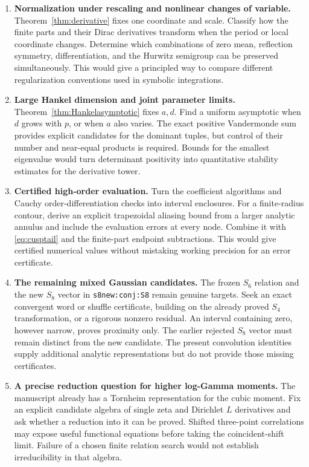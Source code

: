 \documentclass[11pt]{article}
\numberwithin{equation}{section}
\theoremstyle{definition}\newtheorem{definition}[theorem]{Definition}
\theoremstyle{remark}\newtheorem{remark}[theorem]{Remark}
\begin{document}
\begin{enumerate}[leftmargin=*,label=\textbf{\arabic*.},itemsep=7pt]
\item \textbf{Normalization under rescaling and nonlinear changes of variable.}
Theorem~\ref{thm:derivative} fixes one coordinate and scale. Classify how
the finite parts and their Dirac derivatives transform when the period
or local coordinate changes. Determine which combinations of zero mean,
reflection symmetry, differentiation, and the Hurwitz semigroup can be
preserved simultaneously. This would give a principled way to compare
different regularization conventions used in symbolic integrations.

\item \textbf{Large Hankel dimension and joint parameter limits.}
Theorem~\ref{thm:Hankelasymptotic} fixes $a,d$. Find a uniform asymptotic
when $d$ grows with $p$, or when $a$ also varies. The exact positive
Vandermonde sum provides explicit candidates for the dominant tuples,
but control of their number and near-equal products is required.
Bounds for the smallest eigenvalue would turn determinant positivity
into quantitative stability estimates for the derivative tower.

\item \textbf{Certified high-order evaluation.}
Turn the coefficient algorithms and Cauchy order-differentiation checks
into interval enclosures. For a finite-radius contour, derive an explicit
trapezoidal aliasing bound from a larger analytic annulus and include
the evaluation errors at every node. Combine it with
\eqref{eq:cusptail} and the finite-part endpoint subtractions. This would
give certified numerical values without mistaking working precision for
an error certificate.

\item \textbf{The remaining mixed Gaussian candidates.}
The frozen $S_6$ relation and the new $S_8$ vector in
\texttt{s8new:conj:S8} remain genuine targets. Seek an exact convergent
word or shuffle certificate, building on the already proved $S_4$
transformation, or a rigorous nonzero residual. An interval containing
zero, however narrow, proves proximity only. The earlier rejected
$S_8$ vector must remain distinct from the new candidate.
The present convolution identities supply additional analytic
representations but do not provide those missing certificates.

\item \textbf{A precise reduction question for higher log-Gamma moments.}
The manuscript already has a Tornheim representation for the cubic
moment. Fix an explicit candidate algebra of single zeta and Dirichlet
$L$ derivatives and ask whether a reduction into it can be proved.
Shifted three-point correlations may expose useful functional equations
before taking the coincident-shift limit. Failure of a chosen finite
relation search would not establish irreducibility in that algebra.
\end{enumerate}
\end{document}
